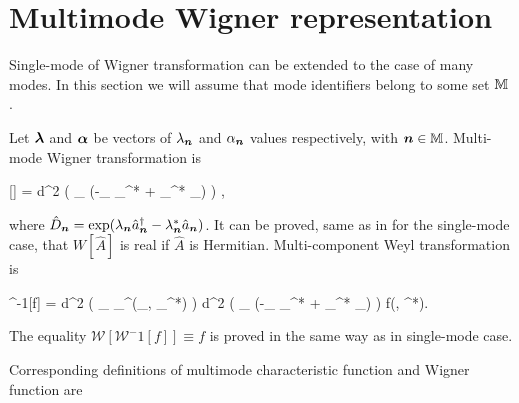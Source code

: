 \section{Multimode Wigner representation}


Single-mode  of Wigner transformation can be extended to the case of many modes.
In this section we will assume that mode identifiers belong to some set $\mathbb{M}$ .

\begin{definition}
\label{def:formalism:mm-wigner:w-transformation}
	Let $\boldsymbol{\lambda}$ and $\boldsymbol{\alpha}$ be vectors of $\lambda_{\boldsymbol{n}}$ and $\alpha_{\boldsymbol{n}}$ values respectively,
	with $\boldsymbol{n} \in \mathbb{M}$.
	Multi-mode Wigner transformation is
	\begin{eqn*}
		[]
		= 
			\int d^2 \blambda
			\left(
				\prod_{\nvec \in \restbasis} \exp(-\lambda_{\nvec} \alpha_{\nvec}^* + \lambda_{\nvec}^* \alpha_{\nvec})
			\right)
			\Trace{
				\hat{A}
				\prod_{\nvec \in \restbasis} \hat{D}_{\nvec} (\lambda_{\nvec}, \lambda_{\nvec}^*)
			},
	\end{eqn*}
	where $\hat{D}_{\boldsymbol{n}} = \exp(\lambda_{\boldsymbol{n}} \hat{a}_{\boldsymbol{n}}^\dagger - \lambda_{\boldsymbol{n}}^* \hat{a}_{\boldsymbol{n}})$.
	It can be proved, same as in  for the single-mode case, that $W[\hat{A}]$ is real if $\hat{A}$ is Hermitian.
	Multi-component Weyl transformation is
	\begin{eqn*}
		^{-1}[f]
		=  \int d^2 \bxi
			\left( \prod_{\nvec \in \restbasis} _{\nvec}^{\dagger}(\xi_{\nvec}, \xi_{\nvec}^*) \right)
			\int d^2 \bfeta
				\left( \prod_{\nvec \in \restbasis}
					\exp(-\eta_{\nvec} \xi_{\nvec}^* + \eta_{\nvec}^* \xi_{\nvec})
				\right) f(\bfeta, \bfeta^*).
	\end{eqn*}
\end{definition}

The equality $\mathcal{W}[\mathcal{W}^-1[f]] \equiv f$ is proved in the same way as in single-mode case.

Corresponding definitions of multimode characteristic function and Wigner function are

